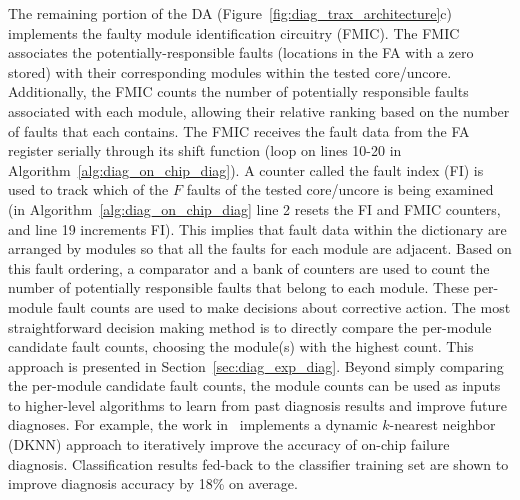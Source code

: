 The remaining portion of the DA (Figure~\ref{fig:diag_trax_architecture}c) implements the faulty module identification circuitry (FMIC).
%
The FMIC associates the potentially-responsible faults (locations in the FA with a zero stored) with their corresponding modules within the tested core/uncore.
%
Additionally, the FMIC counts the number of potentially responsible faults associated with each module, allowing their relative ranking based on the number of faults that each contains.
%
The FMIC receives the fault data from the FA register serially through its shift function (loop on lines 10-20 in Algorithm~\ref{alg:diag_on_chip_diag}).
%
A counter called the fault index (FI) is used to track which of the $F$ faults of the tested core/uncore is being examined (in Algorithm~\ref{alg:diag_on_chip_diag} line 2 resets the FI and FMIC counters, and line 19 increments FI).
%
This implies that fault data within the dictionary are arranged by modules so that all the faults for each module are adjacent.
%
Based on this fault ordering, a comparator and a bank of counters are used to count the number of potentially responsible faults that belong to each module.
%
These per-module fault counts are used to make decisions about corrective action.
%
The most straightforward decision making method is to directly compare the per-module candidate fault counts, choosing the module(s) with the highest count.
%
This approach is presented in Section~\ref{sec:diag_exp_diag}.
%
Beyond simply comparing the per-module candidate fault counts, the module counts can be used as inputs to higher-level algorithms to learn from past diagnosis results and improve future diagnoses.
%
For example, the work in~\cite{ren15} implements a dynamic $k$-nearest neighbor (DKNN) approach to iteratively improve the accuracy of on-chip failure diagnosis.
%
Classification results fed-back to the classifier training set are shown to improve diagnosis accuracy by 18\% on average.

